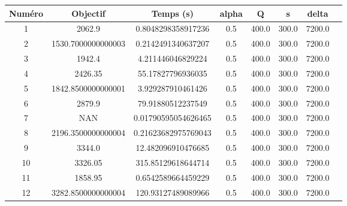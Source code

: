 \begin{tabular}{|c|c|c|c|c|c|c|c|}
\hline
 Numéro & Objectif & Temps (s) & alpha & Q & s & delta \\
\hline
1 & 2062.9 & 0.8048298358917236 & 0.5 & 400.0 & 300.0 & 7200.0 \\ 
 \hline
2 & 1530.7000000000003 & 0.2142491340637207 & 0.5 & 400.0 & 300.0 & 7200.0 \\ 
 \hline
3 & 1942.4 & 4.211446046829224 & 0.5 & 400.0 & 300.0 & 7200.0 \\ 
 \hline
4 & 2426.35 & 55.17827796936035 & 0.5 & 400.0 & 300.0 & 7200.0 \\ 
 \hline
5 & 1842.8500000000001 & 3.929287910461426 & 0.5 & 400.0 & 300.0 & 7200.0 \\ 
 \hline
6 & 2879.9 & 79.91880512237549 & 0.5 & 400.0 & 300.0 & 7200.0 \\ 
 \hline
7 & NAN & 0.01790595054626465 & 0.5 & 400.0 & 300.0 & 7200.0 \\ 
 \hline
8 & 2196.3500000000004 & 0.21623682975769043 & 0.5 & 400.0 & 300.0 & 7200.0 \\ 
 \hline
9 & 3344.0 & 12.482096910476685 & 0.5 & 400.0 & 300.0 & 7200.0 \\ 
 \hline
10 & 3326.05 & 315.85129618644714 & 0.5 & 400.0 & 300.0 & 7200.0 \\ 
 \hline
11 & 1858.95 & 0.6542589664459229 & 0.5 & 400.0 & 300.0 & 7200.0 \\ 
 \hline
12 & 3282.8500000000004 & 120.93127489089966 & 0.5 & 400.0 & 300.0 & 7200.0 \\ 
 \hline
\end{tabular}
